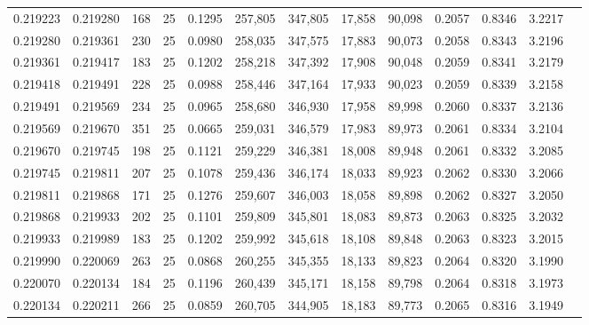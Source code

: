\begin{tabular}{rrrrrrrrrrrrr}
0.219223 & 0.219280 &   168 &  25 &                                     0.1295 & 257,805 & 347,805 &  17,858 &  90,098 & 0.2057 & 0.8346 & 3.2217 \\
0.219280 & 0.219361 &   230 &  25 &                                     0.0980 & 258,035 & 347,575 &  17,883 &  90,073 & 0.2058 & 0.8343 & 3.2196 \\
0.219361 & 0.219417 &   183 &  25 &                                     0.1202 & 258,218 & 347,392 &  17,908 &  90,048 & 0.2059 & 0.8341 & 3.2179 \\
0.219418 & 0.219491 &   228 &  25 &                                     0.0988 & 258,446 & 347,164 &  17,933 &  90,023 & 0.2059 & 0.8339 & 3.2158 \\
0.219491 & 0.219569 &   234 &  25 &                                     0.0965 & 258,680 & 346,930 &  17,958 &  89,998 & 0.2060 & 0.8337 & 3.2136 \\
0.219569 & 0.219670 &   351 &  25 &                                     0.0665 & 259,031 & 346,579 &  17,983 &  89,973 & 0.2061 & 0.8334 & 3.2104 \\
0.219670 & 0.219745 &   198 &  25 &                                     0.1121 & 259,229 & 346,381 &  18,008 &  89,948 & 0.2061 & 0.8332 & 3.2085 \\
0.219745 & 0.219811 &   207 &  25 &                                     0.1078 & 259,436 & 346,174 &  18,033 &  89,923 & 0.2062 & 0.8330 & 3.2066 \\
0.219811 & 0.219868 &   171 &  25 &                                     0.1276 & 259,607 & 346,003 &  18,058 &  89,898 & 0.2062 & 0.8327 & 3.2050 \\
0.219868 & 0.219933 &   202 &  25 &                                     0.1101 & 259,809 & 345,801 &  18,083 &  89,873 & 0.2063 & 0.8325 & 3.2032 \\
0.219933 & 0.219989 &   183 &  25 &                                     0.1202 & 259,992 & 345,618 &  18,108 &  89,848 & 0.2063 & 0.8323 & 3.2015 \\
0.219990 & 0.220069 &   263 &  25 &                                     0.0868 & 260,255 & 345,355 &  18,133 &  89,823 & 0.2064 & 0.8320 & 3.1990 \\
0.220070 & 0.220134 &   184 &  25 &                                     0.1196 & 260,439 & 345,171 &  18,158 &  89,798 & 0.2064 & 0.8318 & 3.1973 \\
0.220134 & 0.220211 &   266 &  25 &                                     0.0859 & 260,705 & 344,905 &  18,183 &  89,773 & 0.2065 & 0.8316 & 3.1949 \\

\end{tabular}
